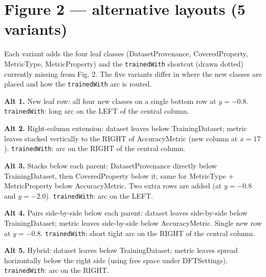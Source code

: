 \documentclass{article}
\begin{document}
\section*{Figure 2 — alternative layouts (5 variants)}

Each variant adds the four leaf classes (DatasetProvenance,
CoveredProperty, MetricType, MetricProperty) and the
\texttt{trainedWith} shortcut (drawn dotted) currently missing from
Fig. 2. The five variants differ in where the new classes are placed
and how the \texttt{trainedWith} arc is routed.

\bigskip

\textbf{Alt 1.} New leaf row: all four new classes on a single bottom
row at $y=-0.8$. \texttt{trainedWith}: long arc on the LEFT of the
central column.\\[0.3em]
\centering
\resizebox{\textwidth}{!}{}

\newpage
\raggedright
\textbf{Alt 2.} Right-column extension: dataset leaves below
TrainingDataset; metric leaves stacked vertically to the RIGHT of
AccuracyMetric (new column at $x=17$). \texttt{trainedWith}: arc on the
RIGHT of the central column.\\[0.3em]
\centering
\resizebox{\textwidth}{!}{}

\newpage
\raggedright
\textbf{Alt 3.} Stacks below each parent: DatasetProvenance directly
below TrainingDataset, then CoveredProperty below it; same for
MetricType + MetricProperty below AccuracyMetric. Two extra rows are
added (at $y=-0.8$ and $y=-2.0$). \texttt{trainedWith}: arc on the
LEFT.\\[0.3em]
\centering
\resizebox{\textwidth}{!}{}

\newpage
\raggedright
\textbf{Alt 4.} Pairs side-by-side below each parent: dataset leaves
side-by-side below TrainingDataset; metric leaves side-by-side below
AccuracyMetric. Single new row at $y=-0.8$. \texttt{trainedWith}: short
tight arc on the RIGHT of the central column.\\[0.3em]
\centering
\resizebox{\textwidth}{!}{}

\newpage
\raggedright
\textbf{Alt 5.} Hybrid: dataset leaves below TrainingDataset; metric
leaves spread horizontally below the right side (using free space
under DFTSettings). \texttt{trainedWith}: arc on the RIGHT.\\[0.3em]
\centering
\resizebox{\textwidth}{!}{}
\end{document}
